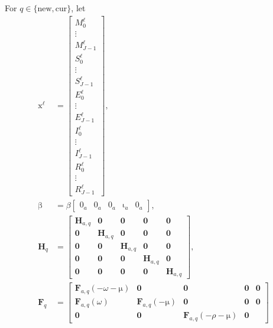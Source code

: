 \documentclass[USenglish]{article}
\renewcommand{\vec}[1]{\boldsymbol{\mathrm{#1}}}
\newcommand{\mat}[1]{\mathbf{#1}}
\begin{document}
For $q \in \{\mathrm{new}, \mathrm{cur}\}$, let
\begin{subequations}
  \begin{align}
    \vec{x}^{\ell} &=
    \begin{bmatrix}
      M_0^{\ell} \\ \vdots \\ M_{J - 1}^{\ell} \\
      S_0^{\ell} \\ \vdots \\ S_{J - 1}^{\ell} \\
      E_0^{\ell} \\ \vdots \\ E_{J - 1}^{\ell} \\
      I_0^{\ell} \\ \vdots \\ I_{J - 1}^{\ell} \\
      R_0^{\ell} \\ \vdots \\ R_{J - 1}^{\ell}
    \end{bmatrix},
    \\
    \vec{\beta} &=
    \beta
    \begin{bmatrix}
      \vec{0}_a & \vec{0}_a & \vec{0}_a & \vec{\iota}_a & \vec{0}_a
    \end{bmatrix},
    \\
    \mat{H}_{q} &=
    \begin{bmatrix}
      \mat{H}_{a, q} & \mat{0} & \mat{0} & \mat{0} & \mat{0} \\
      \mat{0} & \mat{H}_{a, q} & \mat{0} & \mat{0} & \mat{0} \\
      \mat{0} & \mat{0} & \mat{H}_{a, q} & \mat{0} & \mat{0} \\
      \mat{0} & \mat{0} & \mat{0} & \mat{H}_{a, q} & \mat{0}
      \\
      \mat{0} & \mat{0} & \mat{0} & \mat{0} & \mat{H}_{a, q}
    \end{bmatrix},
    \\
    \mat{F}_q &=
    \begin{bmatrix}
      \mat{F}_{a, q}(- \omega - \vec{\mu}) & \mat{0} & \mat{0}
      & \mat{0} & \mat{0}
      \\
      \mat{F}_{a, q}(\omega) & \mat{F}_{a, q}(- \vec{\mu}) & \mat{0}
      & \mat{0} & \mat{0}
      \\
      \mat{0} & \mat{0} & \mat{F}_{a, q}(- \rho - \vec{\mu}) & \mat{0}

\end{bmatrix}
\end{align}
\end{subequations}
\end{document}
